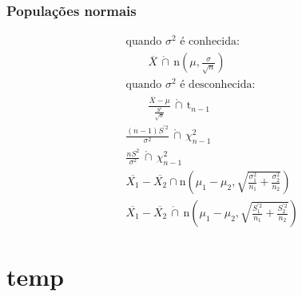 \documentclass[a4paper]{article}
\newcommand{\aproxcap}{\, \mathring{\cap} \,}
\begin{document}
\begin{multicols}{3}
\subsubsection{Populações normais}
\begin{align*}
  &\text{quando } \sigma^2 \text{ é conhecida:} \\
    &\qquad \overline{X} \aproxcap \text{n}\left(\mu, \frac{\sigma}{\sqrt{n}}\right) \\
  &\text{quando } \sigma^2 \text{ é desconhecida:} \\
    &\qquad \frac{\overline{X} - \mu}{\frac{S'}{\sqrt{n}}} \aproxcap \text{t}_{n-1} \\
  &\frac{(n-1)S^{'2}}{\sigma^2} \aproxcap \chi^2_{n-1} \\
  &\frac{n S^2}{\sigma^2} \aproxcap \chi^2_{n-1} \\
  &\overline{X_1} - \overline{X_2} \cap \text{n}\left(\mu_1 - \mu_2, \sqrt{\frac{\sigma_1^2}{n_1} + \frac{\sigma_2^2}{n_2}}\right) \\
  &\overline{X_1} - \overline{X_2} \aproxcap \text{n}\left(\mu_1 - \mu_2, \sqrt{\frac{S_1^{'2}}{n_1} + \frac{S_2^{'2}}{n_2}}\right)
\end{align*}
\section{temp}
\blinddocument
\end{multicols}
\end{document}
